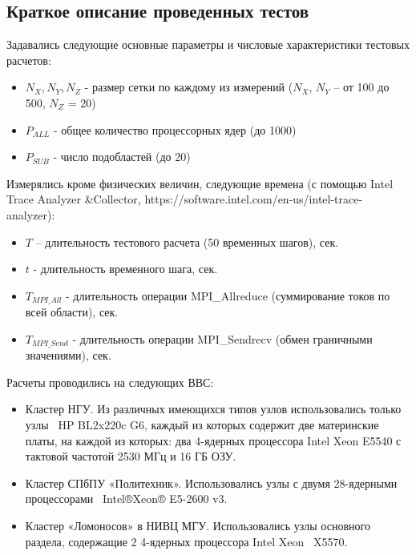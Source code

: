         \subsection{Краткое описание проведенных тестов}
        \label{test_analytics}
        
        Задавались следующие основные параметры и числовые характеристики тестовых расчетов:
         \begin{itemize} 
        \item $N_X, N_Y, N_Z$  - размер сетки по каждому из измерений ($N_X$, $N_Y$ – от 100 до 500, $N_Z$ = 20)
        \item $P_{ALL}$  - общее количество процессорных ядер (до 1000)
        \item $P_{SUB}$  - число подобластей (до 20)
         \end{itemize} 
        Измерялись кроме физических величин, следующие времена (с помощью Intel Trace Analyzer \&Collector, https://software.intel.com/en-us/intel-trace-analyzer):
         \begin{itemize} 
        \item $T$ – длительность тестового расчета (50 временных шагов), сек.
       \item  $t$  - длительность временного шага, сек.
        \item $T_{MPI\_All}$ - длительность операции MPI\_Allreduce (суммирование токов по всей области), сек.
        \item $T_{MPI\_Send}$ - длительность операции MPI\_Sendrecv (обмен граничными значениями), сек.
        \end{itemize}
        
        
        
        Расчеты проводились на следующих ВВС:
        \begin{itemize}
        \item Кластер НГУ. Из различных имеющихся типов узлов использовались только узлы  HP BL2x220c G6, каждый из которых содержит две материнские платы, на каждой из которых: два 4-ядерных процессора Intel Xeon E5540 с тактовой частотой 2530 МГц и 16 ГБ ОЗУ.
        \item Кластер СПбПУ «Политехник». Использовались узлы с двумя 28-ядерными процессорами  Intel®Xeon® E5-2600 v3.
        \item Кластер «Ломоносов» в НИВЦ МГУ. Использовались узлы основного раздела, содержащие 2 4-ядерных процессора Intel Xeon  X5570. 
        \end{itemize}
        
